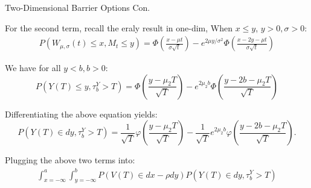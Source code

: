 \documentclass{beamer}
\begin{document}
\begin{frame}{Two-Dimensional Barrier Options Con.}

    {\footnotesize \footnotesize
    \par For the second term, recall the eraly result in one-dim, When \( x \leq y \), $y > 0,  \sigma > 0$:
    \begin{align*}
        P(W_{\mu, \sigma}(t) \leq x,  M_t \leq y) = \Phi \left( \frac{x - \mu t}{\sigma \sqrt{t}} \right) - e^{2\mu y / \sigma^2} 
         \Phi \left( \frac{x - 2y - \mu t}{\sigma \sqrt{t}} \right)
    \end{align*}\pause
    \par We have for all \( y < b,  b > 0 \):
            \[
        P(Y(T) \leq y,  \tau_b^Y > T) = \Phi \left( \frac{y - \mu_2 T}{\sqrt{T}} \right) - e^{2\mu_2 b} \Phi \left( \frac{y - 2b - \mu_2 T}{\sqrt{T}} \right)
        \]
    \par Differentiating the above equation yields:
        \[
        P(Y(T) \in dy,  \tau_b^Y > T) = \frac{1}{\sqrt{T}} \varphi \left( \frac{y - \mu_2 T}{\sqrt{T}} \right) - \frac{1}{\sqrt{T}} e^{2\mu_2 b} \varphi \left( \frac{y - 2b - \mu_2 T}{\sqrt{T}} \right).
        \]\pause
    \par  Plugging the above two terms into:
    \begin{align*}
        \int_{x=-\infty}^{a} \int_{y=-\infty}^{b} P(V(T) \in dx - \rho dy) P(Y(T) \in dy,  \tau_b^Y > T)
    \end{align*}
    }

\end{frame}
\end{document}
